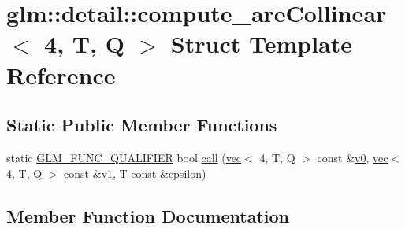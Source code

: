 \hypertarget{structglm_1_1detail_1_1compute__are_collinear_3_014_00_01_t_00_01_q_01_4}{}\section{glm\+:\+:detail\+:\+:compute\+\_\+are\+Collinear$<$ 4, T, Q $>$ Struct Template Reference}
\label{structglm_1_1detail_1_1compute__are_collinear_3_014_00_01_t_00_01_q_01_4}
\subsection*{Static Public Member Functions}
\begin{DoxyCompactItemize}
\item 
static \mbox{\hyperlink{setup_8hpp_a33fdea6f91c5f834105f7415e2a64407}{G\+L\+M\+\_\+\+F\+U\+N\+C\+\_\+\+Q\+U\+A\+L\+I\+F\+I\+ER}} bool \mbox{\hyperlink{structglm_1_1detail_1_1compute__are_collinear_3_014_00_01_t_00_01_q_01_4_ad76314dc4d2ebd03e01707e521f91fb9}{call}} (\mbox{\hyperlink{structglm_1_1vec}{vec}}$<$ 4, T, Q $>$ const \&\mbox{\hyperlink{_s_d_l__opengl__glext_8h_a7062a23d1d434121d4a88f530703d06a}{v0}}, \mbox{\hyperlink{structglm_1_1vec}{vec}}$<$ 4, T, Q $>$ const \&\mbox{\hyperlink{_s_d_l__opengl__glext_8h_a435c176a02c061b43e19bdf7c86cceae}{v1}}, T const \&\mbox{\hyperlink{group__gtc__constants_ga2a1e57fc5592b69cfae84174cbfc9429}{epsilon}})
\end{DoxyCompactItemize}


\subsection{Member Function Documentation}
\mbox{\label{structglm_1_1detail_1_1compute__are_collinear_3_014_00_01_t_00_01_q_01_4_ad76314dc4d2ebd03e01707e521f91fb9}} 
